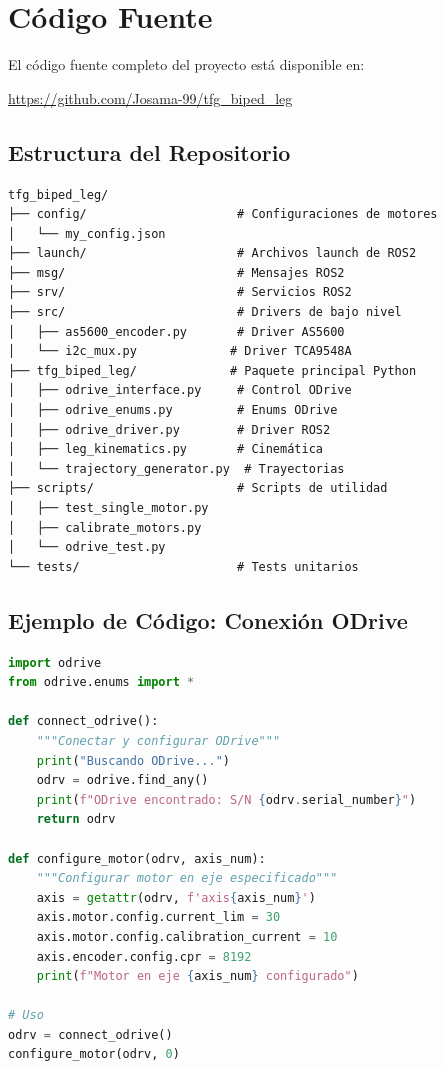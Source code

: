 \section{Código Fuente}

El código fuente completo del proyecto está disponible en:
\begin{center}
\url{https://github.com/Josama-99/tfg_biped_leg}
\end{center}

\subsection{Estructura del Repositorio}
\begin{verbatim}
tfg_biped_leg/
├── config/                     # Configuraciones de motores
│   └── my_config.json
├── launch/                     # Archivos launch de ROS2
├── msg/                        # Mensajes ROS2
├── srv/                        # Servicios ROS2
├── src/                        # Drivers de bajo nivel
│   ├── as5600_encoder.py       # Driver AS5600
│   └── i2c_mux.py             # Driver TCA9548A
├── tfg_biped_leg/             # Paquete principal Python
│   ├── odrive_interface.py     # Control ODrive
│   ├── odrive_enums.py         # Enums ODrive
│   ├── odrive_driver.py        # Driver ROS2
│   ├── leg_kinematics.py       # Cinemática
│   └── trajectory_generator.py  # Trayectorias
├── scripts/                    # Scripts de utilidad
│   ├── test_single_motor.py
│   ├── calibrate_motors.py
│   └── odrive_test.py
└── tests/                      # Tests unitarios
\end{verbatim}

\subsection{Ejemplo de Código: Conexión ODrive}
\begin{lstlisting}[language=Python, caption=Conexión y configuración básica de ODrive]
import odrive
from odrive.enums import *

def connect_odrive():
    """Conectar y configurar ODrive"""
    print("Buscando ODrive...")
    odrv = odrive.find_any()
    print(f"ODrive encontrado: S/N {odrv.serial_number}")
    return odrv

def configure_motor(odrv, axis_num):
    """Configurar motor en eje especificado"""
    axis = getattr(odrv, f'axis{axis_num}')
    axis.motor.config.current_lim = 30
    axis.motor.config.calibration_current = 10
    axis.encoder.config.cpr = 8192
    print(f"Motor en eje {axis_num} configurado")

# Uso
odrv = connect_odrive()
configure_motor(odrv, 0)
\end{lstlisting}

